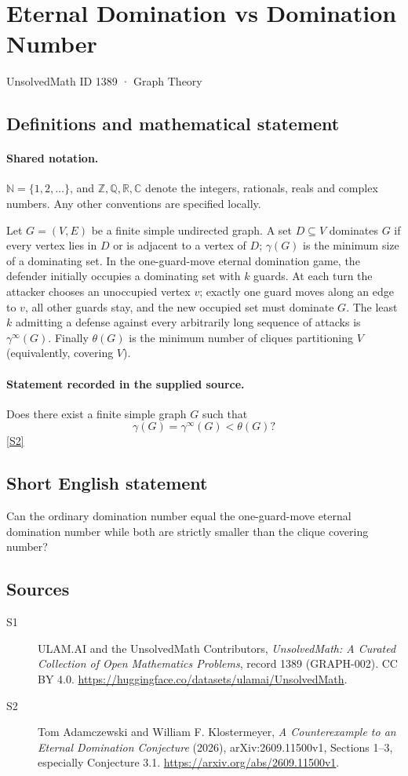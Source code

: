 \documentclass[11pt]{article}
\newcommand{\sref}[2]{\hyperlink{source:#1:#2}{[S#2]}}
\begin{document}
\setcounter{section}{1388}
\section{Eternal Domination vs Domination Number}\label{1389}
{\small\sffamily UnsolvedMath ID 1389 · Graph Theory}
\subsection{Definitions and mathematical statement}

\paragraph{Shared notation.}$\mathbb N=\{1,2,\ldots\}$, and $\mathbb Z,\mathbb Q,\mathbb R,\mathbb C$ denote the integers, rationals, reals and complex numbers. Any other conventions are specified locally.


Let $G=(V,E)$ be a finite simple undirected graph. A set $D\subseteq V$ dominates $G$ if every vertex lies in $D$ or is adjacent to a vertex of $D$; $\gamma(G)$ is the minimum size of a dominating set. In the one-guard-move eternal domination game, the defender initially occupies a dominating set with $k$ guards. At each turn the attacker chooses an unoccupied vertex $v$; exactly one guard moves along an edge to $v$, all other guards stay, and the new occupied set must dominate $G$. The least $k$ admitting a defense against every arbitrarily long sequence of attacks is $\gamma^\infty(G)$. Finally $\theta(G)$ is the minimum number of cliques partitioning $V$ (equivalently, covering $V$).
\paragraph{Statement recorded in the supplied source.}
Does there exist a finite simple graph $G$ such that
\[
 \gamma(G)=\gamma^\infty(G)<\theta(G)?
\]
\sref{1389}{2}
\subsection{Short English statement}
Can the ordinary domination number equal the one-guard-move eternal domination number while both are strictly smaller than the clique covering number?
\subsection{Sources}
\begin{description}
\item[\hypertarget{source:1389:1}{S1}] ULAM.AI and the UnsolvedMath Contributors, \emph{UnsolvedMath: A Curated Collection of Open Mathematics Problems}, record 1389 (GRAPH-002). CC BY 4.0. \url{https://huggingface.co/datasets/ulamai/UnsolvedMath}.
\item[\hypertarget{source:1389:2}{S2}] Tom Adamczewski and William F. Klostermeyer, \emph{A Counterexample to an Eternal Domination Conjecture} (2026), arXiv:2609.11500v1, Sections 1--3, especially Conjecture 3.1. \url{https://arxiv.org/abs/2609.11500v1}.
\end{description}
\label{end:1389}
\end{document}
